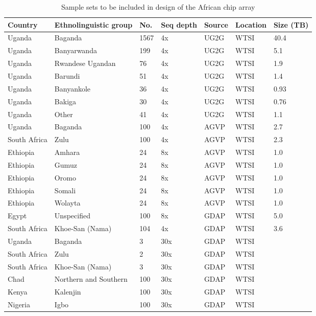 \begin{landscape}
\begin{longtable}{lllllll}
\caption{Sample sets to be included in design of the African chip array}
\label{table:samples}
\hline
Country & Ethnolinguistic group & No. & Seq depth & Source & Location & Size (TB) \\
\hline
\endhead %
Uganda & Baganda & 1567 & 4x & UG2G & WTSI & 40.4 \\
Uganda & Banyarwanda & 199 & 4x & UG2G & WTSI & 5.1 \\
Uganda & Rwandese Ugandan & 76 & 4x & UG2G & WTSI & 1.9 \\
Uganda & Barundi & 51 & 4x & UG2G & WTSI & 1.4 \\
Uganda & Banyankole & 36 & 4x & UG2G & WTSI & 0.93 \\
Uganda & Bakiga & 30 & 4x & UG2G & WTSI & 0.76 \\
Uganda & Other & 41 & 4x & UG2G & WTSI & 1.1 \\
Uganda & Baganda & 100 & 4x & AGVP & WTSI & 2.7 \\
South Africa & Zulu & 100 & 4x & AGVP & WTSI & 2.3 \\
Ethiopia & Amhara & 24 & 8x & AGVP & WTSI & 1.0 \\
Ethiopia & Gumuz & 24 & 8x & AGVP & WTSI & 1.0 \\
Ethiopia & Oromo & 24 & 8x & AGVP & WTSI & 1.0 \\
Ethiopia & Somali & 24 & 8x & AGVP & WTSI & 1.0 \\
Ethiopia & Wolayta & 24 & 8x & AGVP & WTSI & 1.0 \\
Egypt & Unspecified & 100 & 8x & GDAP & WTSI & 5.0 \\
South Africa & Khoe-San (Nama) & 104 & 4x & GDAP & WTSI & 3.6 \\
Uganda & Baganda & 3 & 30x & GDAP & WTSI \\
South Africa & Zulu & 2 & 30x & GDAP & WTSI \\
South Africa & Khoe-San (Nama) & 3 & 30x & GDAP & WTSI \\
Chad & Northern and Southern & 100 & 30x & GDAP & WTSI \\
Kenya & Kalenjin & 100 & 30x & GDAP & WTSI \\
Nigeria & Igbo & 100 & 30x & GDAP & WTSI \\

\end{longtable}
\end{landscape}
